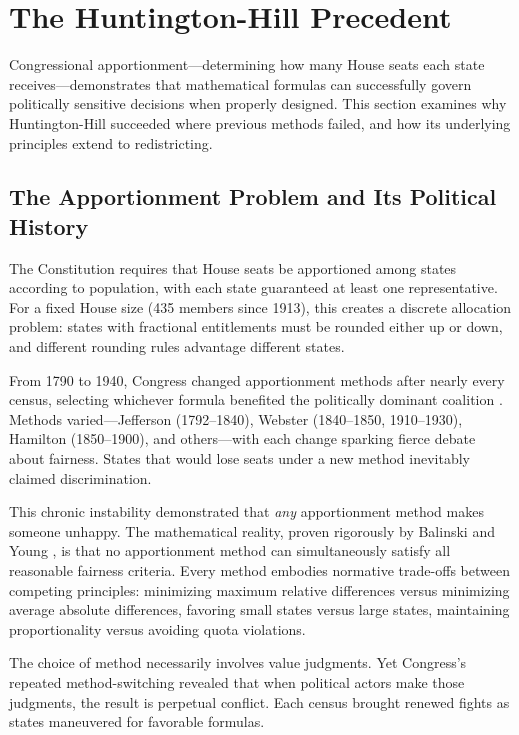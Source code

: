 \section{The Huntington-Hill Precedent}
\label{sec:huntington}

Congressional apportionment—determining how many House seats each state receives—demonstrates that mathematical formulas can successfully govern politically sensitive decisions when properly designed. This section examines why Huntington-Hill succeeded where previous methods failed, and how its underlying principles extend to redistricting.

\subsection{The Apportionment Problem and Its Political History}

The Constitution requires that House seats be apportioned among states according to population, with each state guaranteed at least one representative. For a fixed House size (435 members since 1913), this creates a discrete allocation problem: states with fractional entitlements must be rounded either up or down, and different rounding rules advantage different states.

From 1790 to 1940, Congress changed apportionment methods after nearly every census, selecting whichever formula benefited the politically dominant coalition \cite{balinski1982fair}. Methods varied—Jefferson (1792--1840), Webster (1840--1850, 1910--1930), Hamilton (1850--1900), and others—with each change sparking fierce debate about fairness. States that would lose seats under a new method inevitably claimed discrimination.

This chronic instability demonstrated that \textit{any} apportionment method makes someone unhappy. The mathematical reality, proven rigorously by Balinski and Young \cite{balinski1982fair}, is that no apportionment method can simultaneously satisfy all reasonable fairness criteria. Every method embodies normative trade-offs between competing principles: minimizing maximum relative differences versus minimizing average absolute differences, favoring small states versus large states, maintaining proportionality versus avoiding quota violations.

The choice of method necessarily involves value judgments. Yet Congress's repeated method-switching revealed that when political actors make those judgments, the result is perpetual conflict. Each census brought renewed fights as states maneuvered for favorable formulas.


